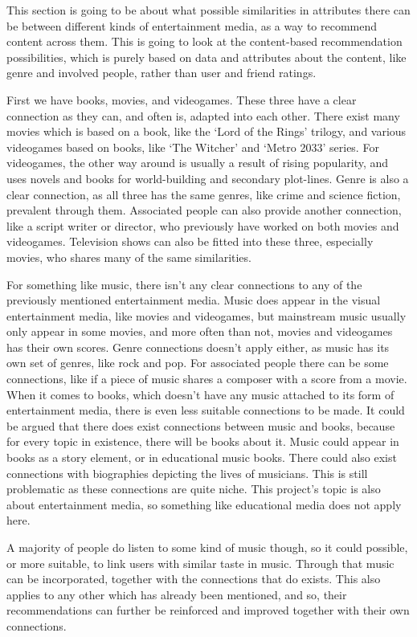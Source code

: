 This section is going to be about what possible similarities in attributes there can be between different kinds of entertainment media, as a way to recommend content across them. This is going to look at the content-based recommendation possibilities, which is purely based on data and attributes about the content, like genre and involved people, rather than user and friend ratings.

First we have books, movies, and videogames. These three have a clear connection as they can, and often is, adapted into each other. There exist many movies which is based on a book, like the ‘Lord of the Rings’ trilogy, and various videogames based on books, like ‘The Witcher’ and ‘Metro 2033’ series. For videogames, the other way around is usually a result of rising popularity, and uses novels and books for world-building and secondary plot-lines. Genre is also a clear connection, as all three has the same genres, like crime and science fiction, prevalent through them. Associated people can also provide another connection, like a script writer or director, who previously have worked on both movies and videogames. Television shows can also be fitted into these three, especially movies, who shares many of the same similarities.

For something like music, there isn’t any clear connections to any of the previously mentioned entertainment media. Music does appear in the visual entertainment media, like movies and videogames, but mainstream music usually only appear in some movies, and more often than not, movies and videogames has their own scores. Genre connections doesn’t apply either, as music has its own set of genres, like rock and pop. For associated people there can be some connections, like if a piece of music shares a composer with a score from a movie. When it comes to books, which doesn’t have any music attached to its form of entertainment media, there is even less suitable connections to be made. It could be argued that there does exist connections between music and books, because for every topic in existence, there will be books about it. Music could appear in books as a story element, or in educational music books. There could also exist connections with biographies depicting the lives of musicians. This is still problematic as these connections are quite niche. This project’s topic is also about entertainment media, so something like educational media does not apply here. 

A majority of people do listen to some kind of music though, so it could possible, or more suitable, to link users with similar taste in music. Through that music can be incorporated, together with the connections that do exists. This also applies to any other which has already been mentioned, and so, their recommendations can further be reinforced and improved together with their own connections.

